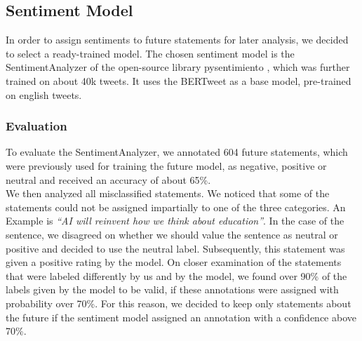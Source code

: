 \subsection{Sentiment Model}
In order to assign sentiments to future statements for later analysis, we decided to select a ready-trained model.
The chosen sentiment model is the SentimentAnalyzer of the open-source library pysentimiento \citep{perez2021pysentimiento}, which was further trained on about 40k tweets.
It uses the BERTweet \citep{bertweet} as a base model, pre-trained on english tweets.

\subsubsection{Evaluation}
To evaluate the SentimentAnalyzer, we annotated 604 future statements, which were previously used for training the future model, as negative, positive or neutral and received an accuracy of about 65\%.
\\
We then analyzed all misclassified statements.
We noticed that some of the statements could not be assigned impartially to one of the three categories.
An Example is \emph{``AI will reinvent how we think about education''}.
In the case of the sentence, we disagreed on whether we should value the sentence as neutral or positive and decided to use the neutral label.
Subsequently, this statement was given a positive rating by the model.
On closer examination of the statements that were labeled differently by us and by the model, we found over 90\% of the labels given by the model to be valid, if these annotations were assigned with probability over 70\%.
For this reason, we decided to keep only statements about the future if the sentiment model assigned an annotation with a confidence above 70\%.

